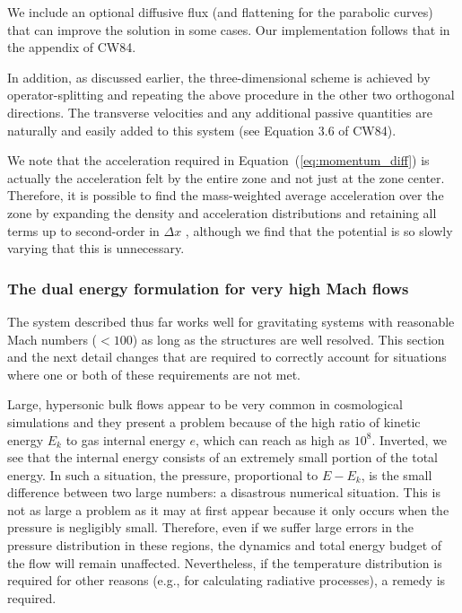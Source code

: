 We include an optional diffusive flux (and flattening for the
parabolic curves) that can improve the solution in some cases.  Our
implementation follows that in the appendix of CW84.

In addition, as discussed earlier, the three-dimensional scheme is
achieved by operator-splitting and repeating the above procedure in
the other two orthogonal directions.  The transverse velocities and
any additional passive quantities are naturally and easily added to
this system (see Equation 3.6 of CW84).  

We note that the acceleration required in
Equation~(\ref{eq:momentum_diff}) is actually the acceleration felt by
the entire zone and not just at the zone center.  Therefore, it is
possible to find the mass-weighted average acceleration over the zone
by expanding the density and acceleration distributions and retaining
all terms up to second-order in $\Delta x$
\citep{1995CoPhC..89..149B}, although we find that the potential is so
slowly varying that this is unnecessary.


\subsubsection{The dual energy formulation for  very high Mach flows} %

The system described thus far works well for gravitating systems with
reasonable Mach numbers ($<100$) as long as the structures are well
resolved.  This section and the next detail changes that are required
to correctly account for situations where one or both of these
requirements are not met.

Large, hypersonic bulk flows appear to be very common in cosmological
simulations and they present a problem because of the high ratio of
kinetic energy $E_k$ to gas internal energy $e$, which can reach as
high as $10^8$.  Inverted, we see that the internal energy consists of
an extremely small portion of the total energy.  In such a situation,
the pressure, proportional to $E - E_{k}$, is the small difference
between two large numbers: a disastrous numerical situation.  This is
not as large a problem as it may at first appear because it only
occurs when the pressure is negligibly small.  Therefore, even if we
suffer large errors in the pressure distribution in these regions, the
dynamics and total energy budget of the flow will remain unaffected.
Nevertheless, if the temperature distribution is required for other
reasons (e.g., for calculating radiative processes), a remedy is
required.

